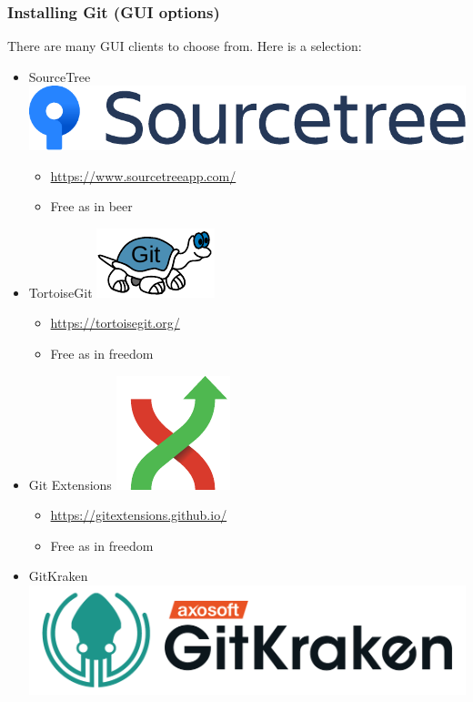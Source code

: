 \documentclass{git_course}
\begin{document}
\begin{frame}
\frametitle{Installing Git (GUI options)}
There are many GUI clients to choose from.  Here is a selection:
\begin{itemize}
    \item SourceTree
        \includegraphics[height=0.05\textheight]{images/Sourcetree-blue.pdf}
        \begin{itemize}
            \item \url{https://www.sourcetreeapp.com/}
            \item Free as in beer
        \end{itemize}
    \item TortoiseGit
        \includegraphics[height=0.05\textheight]{images/tgit_logo.pdf}
        \begin{itemize}
            \item \url{https://tortoisegit.org/}
            \item Free as in freedom
        \end{itemize}
    \item Git Extensions
        \includegraphics[height=0.05\textheight]{images/git-extensions-logo.pdf}
        \begin{itemize}
            \item \url{https://gitextensions.github.io/}
            \item Free as in freedom
        \end{itemize}
    \item GitKraken
        \includegraphics[height=0.05\textheight]{images/gitkraken-logo-dark-hz.png}

\end{itemize}
\end{frame}
\end{document}
